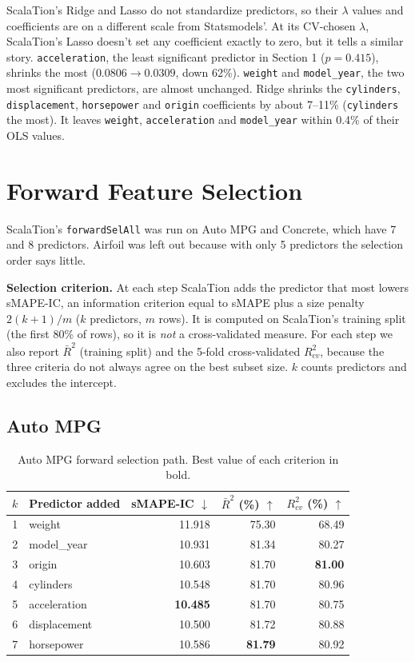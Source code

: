 \documentclass[11pt]{article}
\begin{document}
ScalaTion's Ridge and Lasso do not standardize predictors, so their $\lambda$ values and
coefficients are on a different scale from Statsmodels'. At its CV-chosen
$\lambda$, ScalaTion's Lasso doesn't set any coefficient exactly to zero, but
it tells a similar story. \texttt{acceleration}, the least significant
predictor in Section 1 ($p=0.415$), shrinks the most ($0.0806\rightarrow
0.0309$, down 62\%). \texttt{weight} and \texttt{model\_year}, the two most
significant predictors, are almost unchanged. Ridge shrinks the
\texttt{cylinders}, \texttt{displacement}, \texttt{horsepower} and
\texttt{origin} coefficients by about 7--11\% (\texttt{cylinders} the
most). It leaves \texttt{weight}, \texttt{acceleration} and
\texttt{model\_year} within 0.4\% of their OLS values.

\clearpage
\section{Forward Feature Selection}
ScalaTion's \texttt{forwardSelAll} was run on Auto MPG and Concrete, which
have 7 and 8 predictors. Airfoil was left out because with only 5 predictors
the selection order says little.

\textbf{Selection criterion.} At each step ScalaTion adds the predictor that
most lowers sMAPE-IC, an information criterion equal to sMAPE plus a size
penalty $2(k+1)/m$ ($k$ predictors, $m$ rows). It is computed on ScalaTion's
training split (the first 80\% of rows), so it is \emph{not} a cross-validated
measure. For each step we also report $\bar R^2$ (training split) and the
5-fold cross-validated $R^2_{cv}$, because the three criteria do not always
agree on the best subset size. $k$ counts predictors and excludes the
intercept.

\subsection{Auto MPG}
\begin{table}[H]
\centering
\caption{Auto MPG forward selection path. Best value of each criterion in
bold.}
\begin{tabular}{rlrrr}
\toprule
$k$ & Predictor added & sMAPE-IC $\downarrow$ & $\bar R^2$ (\%) $\uparrow$ & $R^2_{cv}$ (\%) $\uparrow$ \\
\midrule
1 & weight & 11.918 & 75.30 & 68.49 \\
2 & model\_year & 10.931 & 81.34 & 80.27 \\
3 & origin & 10.603 & 81.70 & \textbf{81.00} \\
4 & cylinders & 10.548 & 81.70 & 80.96 \\
5 & acceleration & \textbf{10.485} & 81.70 & 80.75 \\
6 & displacement & 10.500 & 81.72 & 80.88 \\
7 & horsepower & 10.586 & \textbf{81.79} & 80.92 \\
\bottomrule
\end{tabular}
\end{table}
\end{document}
